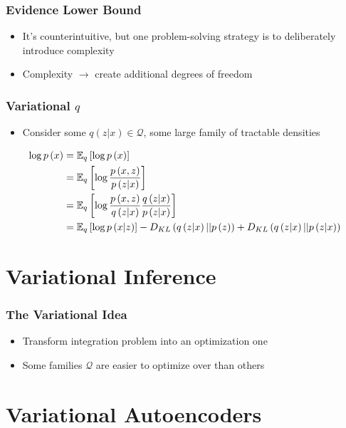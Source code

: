 \documentclass[10pt,mathserif]{beamer}
\begin{document}
\begin{frame}
  \frametitle{Evidence Lower Bound}
  \begin{itemize}
  \item It's counterintuitive, but one problem-solving strategy is to deliberately introduce complexity
  \item Complexity $\rightarrow$ create additional degrees of freedom
  \end{itemize} 
\end{frame}

\begin{frame}
  \frametitle{Variational $q$}
  \begin{itemize}
  \item Consider some $q\left(z \vert x\right) \in \mathcal{Q}$, some large
    family of tractable densities
  \end{itemize} 
  \begin{align*}
    \log p\left(x\right) &= \mathbb{E}_{q}\left[{\log p\left(x\right)}\right] \\
    &= \mathbb{E}_{q}\left[{\log \frac{p\left(x, z\right)}{p\left(z \vert x\right)}}\right] \\
    &= \mathbb{E}_{q}\left[{\log \frac{p\left(x, z\right)}{q\left(z \vert x\right)} \frac{q\left(z \vert x\right)}{p\left(z \vert x\right)}}\right] \\
    &= \mathbb{E}_{q}\left[{\log p\left(x \vert z\right)}\right] - D_{KL}\left(q\left(z \vert x\right) \vert \vert p\left(z\right)\right) + D_{KL}\left(q\left(z \vert x\right) \vert \vert p\left(z \vert x\right)\right)
  \end{align*}
\end{frame}

\section{Variational Inference}
\label{sec:introduction}

\begin{frame}
  \frametitle{The Variational Idea}
  \begin{itemize}
  \item Transform integration problem into an optimization one
  \item Some families $\mathcal{Q}$ are easier to optimize over than others
  \end{itemize} 
\end{frame}


\section{Variational Autoencoders}
\end{document}
